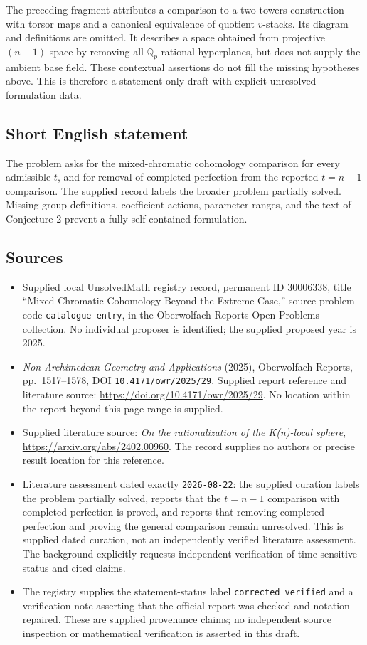 \documentclass[11pt]{article}
\newcommand{\Q}{\mathbb{Q}}
\begin{document}
The preceding fragment attributes a comparison to a two-towers construction with torsor maps and a canonical equivalence of quotient \(v\)-stacks. Its diagram and definitions are omitted. It describes a space obtained from projective \((n-1)\)-space by removing all \(\Q_p\)-rational hyperplanes, but does not supply the ambient base field. These contextual assertions do not fill the missing hypotheses above. This is therefore a statement-only draft with explicit unresolved formulation data.
\subsection{Short English statement}
The problem asks for the mixed-chromatic cohomology comparison for every admissible \(t\), and for removal of completed perfection from the reported \(t=n-1\) comparison. The supplied record labels the broader problem partially solved. Missing group definitions, coefficient actions, parameter ranges, and the text of Conjecture 2 prevent a fully self-contained formulation.
\subsection{Sources}
\begin{itemize}
\item Supplied local UnsolvedMath registry record, permanent ID \(30006338\), title ``Mixed-Chromatic Cohomology Beyond the Extreme Case,'' source problem code \texttt{catalogue entry}, in the Oberwolfach Reports Open Problems collection. No individual proposer is identified; the supplied proposed year is 2025.
\item \emph{Non-Archimedean Geometry and Applications} (2025), Oberwolfach Reports, pp.~1517--1578, DOI \texttt{10.4171/owr/2025/29}. Supplied report reference and literature source: \url{https://doi.org/10.4171/owr/2025/29}. No location within the report beyond this page range is supplied.
\item Supplied literature source: \emph{On the rationalization of the K(n)-local sphere}, \url{https://arxiv.org/abs/2402.00960}. The record supplies no authors or precise result location for this reference.
\item Literature assessment dated exactly \texttt{2026-08-22}: the supplied curation labels the problem partially solved, reports that the \(t=n-1\) comparison with completed perfection is proved, and reports that removing completed perfection and proving the general comparison remain unresolved. This is supplied dated curation, not an independently verified literature assessment. The background explicitly requests independent verification of time-sensitive status and cited claims.
\item The registry supplies the statement-status label \texttt{corrected\_verified} and a verification note asserting that the official report was checked and notation repaired. These are supplied provenance claims; no independent source inspection or mathematical verification is asserted in this draft.
\end{itemize}
\end{document}

